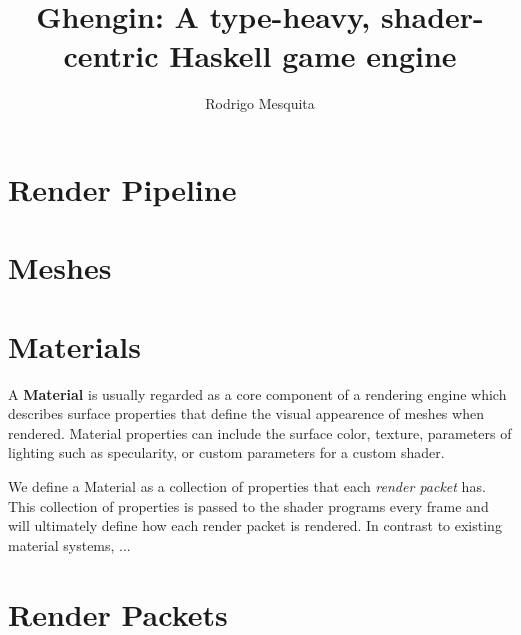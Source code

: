 \documentclass{article}
\title{Ghengin: A type-heavy, shader-centric Haskell game engine}
\author{Rodrigo Mesquita}
\begin{document}
\maketitle

\section{Render Pipeline}

\section{Meshes}

\section{Materials}

A \textbf{Material} is usually regarded as a core component of a rendering
engine which describes surface properties that define the visual appearence of
meshes when rendered. Material properties can include the surface color,
texture, parameters of lighting such as specularity, or custom parameters for a
custom shader.

We define a Material as a collection of properties that each \emph{render
packet} has. This collection of properties is passed to the shader programs
every frame and will ultimately define how each render packet is rendered. In
contrast to existing material systems, ...

\section{Render Packets}
\end{document}
